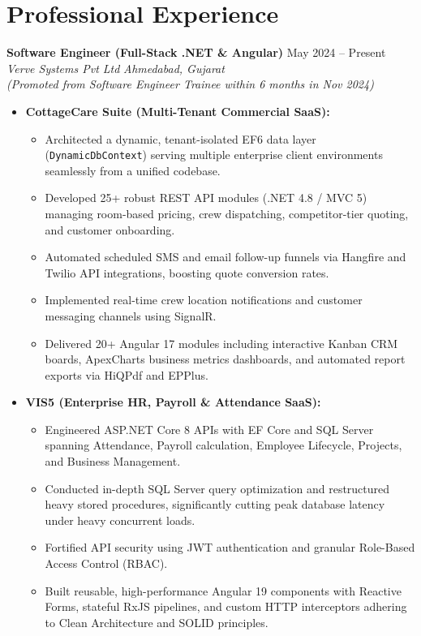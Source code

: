\documentclass[a4paper,10pt]{article}
\begin{document}
\section{Professional Experience}
\textbf{Software Engineer (Full-Stack .NET \& Angular)} \hfill May 2024 -- Present \\
\textit{Verve Systems Pvt Ltd} \hfill \textit{Ahmedabad, Gujarat} \\
\textit{(Promoted from Software Engineer Trainee within 6 months in Nov 2024)}
\begin{itemize}[leftmargin=0.15in]
    \item \textbf{CottageCare Suite (Multi-Tenant Commercial SaaS):}
    \begin{itemize}
        \item Architected a dynamic, tenant-isolated EF6 data layer (\texttt{DynamicDbContext}) serving multiple enterprise client environments seamlessly from a unified codebase.
        \item Developed 25+ robust REST API modules (.NET 4.8 / MVC 5) managing room-based pricing, crew dispatching, competitor-tier quoting, and customer onboarding.
        \item Automated scheduled SMS and email follow-up funnels via Hangfire and Twilio API integrations, boosting quote conversion rates.
        \item Implemented real-time crew location notifications and customer messaging channels using SignalR.
        \item Delivered 20+ Angular 17 modules including interactive Kanban CRM boards, ApexCharts business metrics dashboards, and automated report exports via HiQPdf and EPPlus.
    \end{itemize}
    \item \textbf{VIS5 (Enterprise HR, Payroll \& Attendance SaaS):}
    \begin{itemize}
        \item Engineered ASP.NET Core 8 APIs with EF Core and SQL Server spanning Attendance, Payroll calculation, Employee Lifecycle, Projects, and Business Management.
        \item Conducted in-depth SQL Server query optimization and restructured heavy stored procedures, significantly cutting peak database latency under heavy concurrent loads.
        \item Fortified API security using JWT authentication and granular Role-Based Access Control (RBAC).
        \item Built reusable, high-performance Angular 19 components with Reactive Forms, stateful RxJS pipelines, and custom HTTP interceptors adhering to Clean Architecture and SOLID principles.
    \end{itemize}
\end{itemize}
\end{document}
